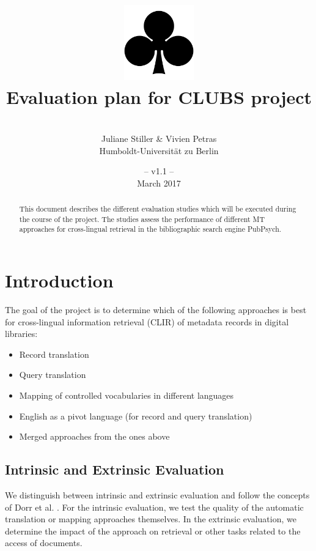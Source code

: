 \documentclass[a4paper,11pt]{article}
\title{
\includegraphics[width=3cm]{./img/200px-SuitClubs.png} \\
\Huge Evaluation plan for CLUBS project \\ 
}
\author{\vspace*{1cm}\\ \LARGE Juliane Stiller \& Vivien Petras \medskip \\ \Large Humboldt-Universit\"at zu Berlin}
\date{\vspace*{2cm} -- v1.1 --\\March 2017}
\begin{document}
\clearpage\maketitle
\thispagestyle{empty}

\vspace*{5cm}
\begin{abstract}
This document describes the different evaluation studies which will be executed during the course of the project. The studies assess the performance of different MT approaches for cross-lingual retrieval in the bibliographic search engine PubPsych.
\end{abstract}

\newpage
\tableofcontents
\clearpage


\section{Introduction}
\label{s:intro}

The goal of the project is to determine which of the following approaches is best for cross-lingual information retrieval (CLIR) of metadata records in digital libraries:
\begin{itemize}
\item Record translation
\item Query translation
\item Mapping of controlled vocabularies in different languages
\item English as a pivot language (for record and query translation)
\item Merged approaches from the ones above
\end{itemize}

\subsection{Intrinsic and Extrinsic Evaluation}
We distinguish between intrinsic and extrinsic evaluation and follow the concepts of Dorr et al. \cite{dorr_machine_2011}. For the intrinsic evaluation, we test the quality of the automatic translation or mapping approaches themselves. In the extrinsic evaluation, we determine the impact of the approach on retrieval or other tasks related to the access of documents.
\end{document}
